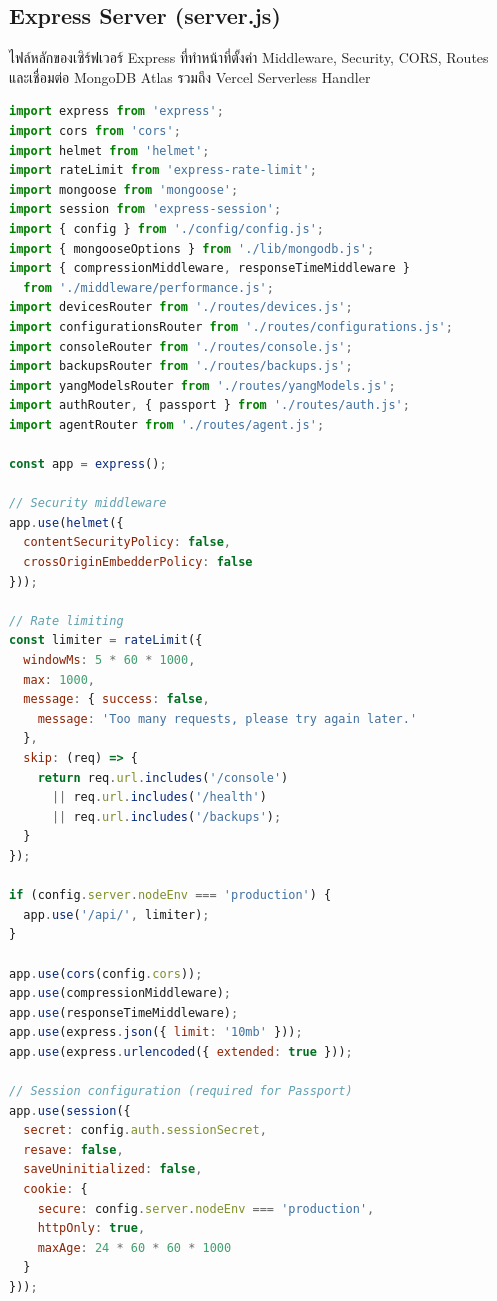 \subsection{Express Server (server.js)}
\hspace*{1.3em}
ไฟล์หลักของเซิร์ฟเวอร์ Express ที่ทำหน้าที่ตั้งค่า Middleware, Security, CORS, Routes และเชื่อมต่อ MongoDB Atlas รวมถึง Vercel Serverless Handler

\begin{lstlisting}[language=JavaScript, caption={server.js -- Express Server Setup}]
import express from 'express';
import cors from 'cors';
import helmet from 'helmet';
import rateLimit from 'express-rate-limit';
import mongoose from 'mongoose';
import session from 'express-session';
import { config } from './config/config.js';
import { mongooseOptions } from './lib/mongodb.js';
import { compressionMiddleware, responseTimeMiddleware }
  from './middleware/performance.js';
import devicesRouter from './routes/devices.js';
import configurationsRouter from './routes/configurations.js';
import consoleRouter from './routes/console.js';
import backupsRouter from './routes/backups.js';
import yangModelsRouter from './routes/yangModels.js';
import authRouter, { passport } from './routes/auth.js';
import agentRouter from './routes/agent.js';

const app = express();

// Security middleware
app.use(helmet({
  contentSecurityPolicy: false,
  crossOriginEmbedderPolicy: false
}));

// Rate limiting
const limiter = rateLimit({
  windowMs: 5 * 60 * 1000,
  max: 1000,
  message: { success: false,
    message: 'Too many requests, please try again later.'
  },
  skip: (req) => {
    return req.url.includes('/console')
      || req.url.includes('/health')
      || req.url.includes('/backups');
  }
});

if (config.server.nodeEnv === 'production') {
  app.use('/api/', limiter);
}

app.use(cors(config.cors));
app.use(compressionMiddleware);
app.use(responseTimeMiddleware);
app.use(express.json({ limit: '10mb' }));
app.use(express.urlencoded({ extended: true }));

// Session configuration (required for Passport)
app.use(session({
  secret: config.auth.sessionSecret,
  resave: false,
  saveUninitialized: false,
  cookie: {
    secure: config.server.nodeEnv === 'production',
    httpOnly: true,
    maxAge: 24 * 60 * 60 * 1000
  }
}));


\end{lstlisting}
